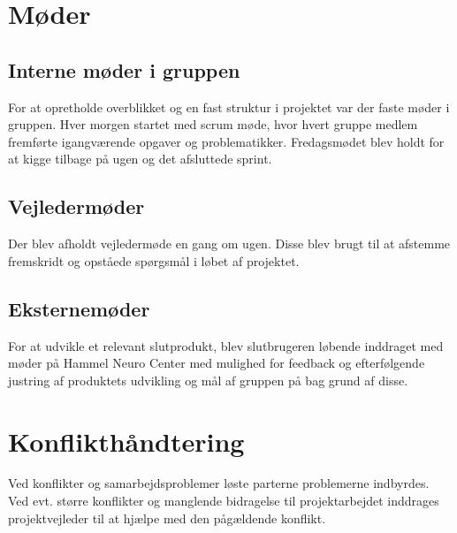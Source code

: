 \chapter{Møder}
\section{Interne møder i gruppen}
For at opretholde overblikket og en fast struktur i projektet var der faste møder i gruppen. Hver morgen startet med scrum møde, hvor hvert gruppe medlem fremførte igangværende opgaver og problematikker. Fredagsmødet blev holdt for at kigge tilbage på ugen og det afsluttede sprint. 

\section{Vejledermøder}
Der blev afholdt vejledermøde en gang om ugen. Disse blev brugt til at afstemme fremskridt og opståede spørgsmål i løbet af projektet.

\section{Eksternemøder}
For at udvikle et relevant slutprodukt, blev slutbrugeren løbende inddraget med møder på Hammel Neuro Center med mulighed for feedback og efterfølgende justring af produktets udvikling og mål af gruppen på bag grund af disse. 


\chapter{Konflikthåndtering}
Ved konflikter og samarbejdsproblemer løste parterne problemerne indbyrdes. Ved evt. større konflikter og manglende bidragelse til projektarbejdet inddrages projektvejleder til at hjælpe med den pågældende konflikt. 







































